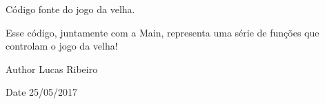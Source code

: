 Código fonte do jogo da velha. 

Esse código, juntamente com a Main, representa uma série de funções que controlam o jogo da velha!

\begin{DoxyAuthor}{Author}
Lucas Ribeiro 
\end{DoxyAuthor}
\begin{DoxyDate}{Date}
25/05/2017 
\end{DoxyDate}
